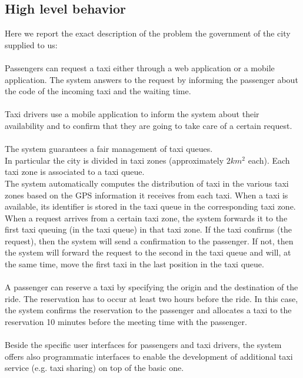 \subsection{High level behavior}
Here we report the exact description of the problem the government of the city supplied to us: \\ \\ 
Passengers can request a taxi either through a web application or a mobile application.
The system answers to the request by informing the passenger about the code of the incoming taxi and the waiting time.\\ \\
Taxi drivers use a mobile application to inform the system about their availability and to confirm that they are going to take care of a certain request. \\ \\  
The system guarantees a fair management of taxi queues. \\
In particular the city is divided in taxi zones (approximately $2 km^{2}$ each). Each taxi zone is associated to a taxi queue.\\
The system automatically computes the distribution of taxi in the various taxi zones based on the GPS information it receives from each taxi. When a taxi is available, its identifier is stored in the taxi queue in the corresponding taxi zone. When a request arrives from a certain taxi zone, the system forwards it to the first taxi queuing (in the taxi queue) in that taxi zone. If the taxi confirms (the request), then the system will send a confirmation to the passenger. If not, then the system will forward the request to the second in the taxi queue and will, at the same time, move the first taxi in the last position in the taxi queue.\\ \\
A passenger can reserve a taxi by specifying the origin and the destination of the ride. The reservation has to occur at least two hours before the ride. In this case, the system confirms the reservation to the passenger and allocates a taxi to the reservation 10 minutes before the meeting time with the passenger. \\ \\
Beside the specific user interfaces for passengers and taxi drivers, the system offers also programmatic interfaces to enable the development of additional taxi service (e.g. taxi sharing) on top of the basic one. 



